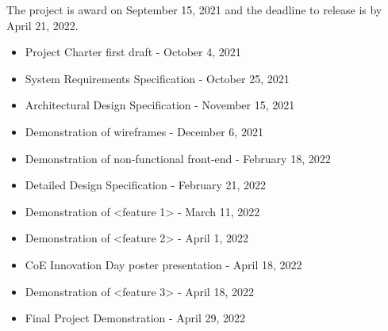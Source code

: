 The project is award on September 15, 2021 and the deadline to release is by April 21, 2022.
\begin{itemize}
  \item Project Charter first draft - October 4, 2021 
  \item System Requirements Specification - October 25, 2021
  \item Architectural Design Specification - November 15, 2021
  \item Demonstration of wireframes -  December 6, 2021
  \item Demonstration of non-functional front-end - February 18, 2022
  \item Detailed Design Specification - February 21, 2022
  \item Demonstration of <feature 1> - March 11, 2022
   \item Demonstration of <feature 2> - April 1, 2022
  \item CoE Innovation Day poster presentation - April 18, 2022
  \item Demonstration of <feature 3> - April 18, 2022
  \item Final Project Demonstration - April 29, 2022
\end{itemize}